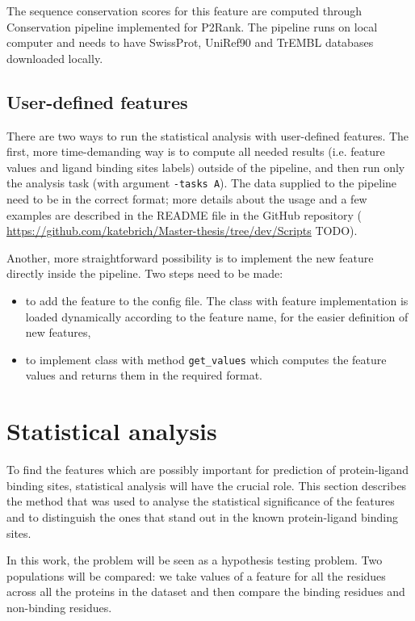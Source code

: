 The sequence conservation scores for this feature are computed through Conservation pipeline \cite{conservation} implemented for P2Rank. The pipeline runs on local computer and needs to have SwissProt, UniRef90 and TrEMBL databases downloaded locally.

\subsection{User-defined features}

There are two ways to run the statistical analysis with user-defined features. The first, more time-demanding way is to compute all needed results (i.e. feature values and ligand binding sites labels) outside of the pipeline, and then run only the analysis task (with argument \texttt{-tasks A}). The data supplied to the pipeline need to be in the correct format; more details about the usage and a few  examples are described in the README file in the GitHub repository (\url{ https://github.com/katebrich/Master-thesis/tree/dev/Scripts} TODO).

Another, more straightforward possibility is to implement the new feature directly inside the pipeline. Two steps need to be made:

\begin{itemize}
\item to add the feature to the config file. The class with feature implementation is loaded dynamically according to the feature name, for the easier definition of new features,
\item to implement class with method \texttt{get\_values} which computes the feature values and returns them in the required format.
\end{itemize}

\section{Statistical analysis}

To find the features which are possibly important for prediction of protein-ligand binding sites, statistical analysis will have the crucial role. This section describes the method that was used to analyse the statistical significance of the features and to distinguish the ones that stand out in the known protein-ligand binding sites.

In this work, the problem will be seen as a hypothesis testing problem. Two populations will be compared: we take values of a feature for all the residues across all the proteins in the dataset and then compare the binding residues and non-binding residues.

